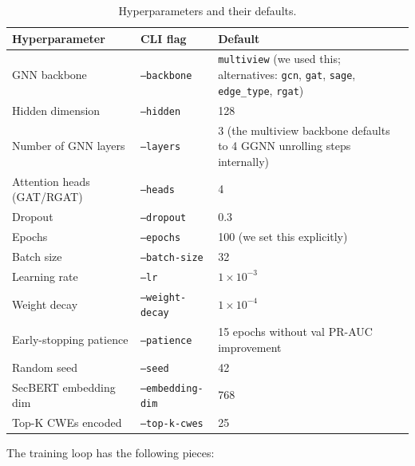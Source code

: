 \documentclass[11pt]{article}
\begin{document}
\begin{table}[h]
\centering
\small
\begin{tabular}{lll}
\toprule
Hyperparameter & CLI flag & Default \\
\midrule
GNN backbone               & \texttt{--backbone}        & \texttt{multiview} (we used this; alternatives: \texttt{gcn}, \texttt{gat}, \texttt{sage}, \texttt{edge\_type}, \texttt{rgat}) \\
Hidden dimension           & \texttt{--hidden}          & 128 \\
Number of GNN layers       & \texttt{--layers}          & 3 (the multiview backbone defaults to 4 GGNN unrolling steps internally) \\
Attention heads (GAT/RGAT) & \texttt{--heads}           & 4 \\
Dropout                    & \texttt{--dropout}         & 0.3 \\
Epochs                     & \texttt{--epochs}          & 100 (we set this explicitly) \\
Batch size                 & \texttt{--batch-size}      & 32 \\
Learning rate              & \texttt{--lr}              & $1 \times 10^{-3}$ \\
Weight decay               & \texttt{--weight-decay}    & $1 \times 10^{-4}$ \\
Early-stopping patience    & \texttt{--patience}        & 15 epochs without val PR-AUC improvement \\
Random seed                & \texttt{--seed}            & 42 \\
SecBERT embedding dim      & \texttt{--embedding-dim}   & 768 \\
Top-K CWEs encoded         & \texttt{--top-k-cwes}      & 25 \\
\bottomrule
\end{tabular}
\caption{Hyperparameters and their defaults.}
\end{table}

The training loop has the following pieces:
\end{document}
